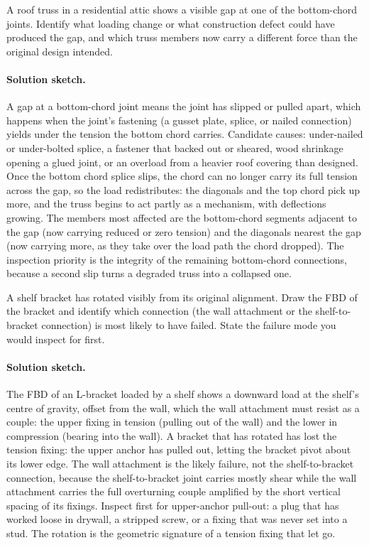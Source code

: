 \begin{exercise}
A roof truss in a residential attic shows a visible gap at one of
the bottom-chord joints. Identify what loading change or what
construction defect could have produced the gap, and which truss
members now carry a different force than the original design
intended.

\paragraph{Solution sketch.} A gap at a bottom-chord joint means the
joint has slipped or pulled apart, which happens when the joint's
fastening (a gusset plate, splice, or nailed connection) yields under
the tension the bottom chord carries. Candidate causes: under-nailed or
under-bolted splice, a fastener that backed out or sheared, wood
shrinkage opening a glued joint, or an overload from a heavier roof
covering than designed. Once the bottom chord splice slips, the chord can
no longer carry its full tension across the gap, so the load redistributes:
the diagonals and the top chord pick up more, and the truss begins to act
partly as a mechanism, with deflections growing. The members most
affected are the bottom-chord segments adjacent to the gap (now carrying
reduced or zero tension) and the diagonals nearest the gap (now carrying
more, as they take over the load path the chord dropped). The inspection
priority is the integrity of the remaining bottom-chord connections,
because a second slip turns a degraded truss into a collapsed one.
\end{exercise}

\begin{exercise}
A shelf bracket has rotated visibly from its original alignment.
Draw the FBD of the bracket and identify which connection (the
wall attachment or the shelf-to-bracket connection) is most likely
to have failed. State the failure mode you would inspect for first.

\paragraph{Solution sketch.} The FBD of an L-bracket loaded by a shelf
shows a downward load at the shelf's centre of gravity, offset from the
wall, which the wall attachment must resist as a couple: the upper fixing
in tension (pulling out of the wall) and the lower in compression
(bearing into the wall). A bracket that has rotated has lost the tension
fixing: the upper anchor has pulled out, letting the bracket pivot about
its lower edge. The wall attachment is the likely failure, not the
shelf-to-bracket connection, because the shelf-to-bracket joint carries
mostly shear while the wall attachment carries the full overturning
couple amplified by the short vertical spacing of its fixings. Inspect
first for upper-anchor pull-out: a plug that has worked loose in
drywall, a stripped screw, or a fixing that was never set into a stud.
The rotation is the geometric signature of a tension fixing that let go.
\end{exercise}

